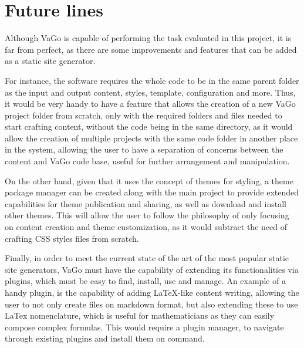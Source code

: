 
\chapter{Future lines}\label{ch:futurelines}

Although VaGo is capable of performing the task evaluated in this project, it is far from perfect, as there are some
improvements and features that can be added as a static site generator.

For instance, the software requires the whole code to be in the same parent folder as the input and output content,
styles, template, configuration and more.
Thus, it would be very handy to have a feature that allows the creation of a new VaGo project folder from scratch,
only with the required folders and files needed to start crafting content, without the code being in the same
directory, as it would allow the creation of multiple projects with the same code folder in another place in the
system, allowing the user to have a separation of concerns between the content and VaGo code base, useful for further
arrangement and manipulation.

On the other hand, given that it uses the concept of themes for styling, a theme package manager can be created along
with the main project to provide extended capabilities for theme publication and sharing, as well as download and
install other themes.
This will allow the user to follow the philosophy of only focusing on content creation and theme customization, as it
would subtract the need of crafting CSS styles files from scratch.

Finally, in order to meet the current state of the art of the most popular static site generators, VaGo must have the
capability of extending its functionalities via plugins, which must be easy to find, install, use and manage.
An example of a handy plugin, is the capability of adding LaTeX-like content writing, allowing the user to not only
create files on markdown format, but also extending these to use LaTex nomenclature, which is useful for
mathematicians as they can easily compose complex formulas.
This would require a plugin manager, to navigate through existing plugins and install them on command.